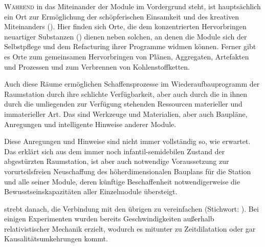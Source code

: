 \begin{newstuff}
   \lettrine{W}{ährend} in  das Miteinander der Module im Vordergrund steht, ist  hauptsächlich ein Ort zur Ermöglichung der schöpferischen Einsamkeit und des kreativen Miteinanders (). Hier finden sich Orte, die dem konzentrierten Hervorbringen neuartiger Substanzen () dienen neben solchen, an denen die Module sich der Selbstpflege und dem Refacturing ihrer Programme widmen können. Ferner gibt es Orte zum gemeinsamen Hervorbringen von Plänen, Aggregaten, Artefakten und Prozessen und zum Verbrennen von Kohlenstoffketten. 


    Auch diese Räume ermöglichen Schaffensprozesse im Wiederaufbauprogramm der Raumstation durch ihre schlichte Verfügbarkeit, aber auch durch die in ihnen durch die umliegenden  zur Verfügung stehenden Ressourcen materieller und immaterieller Art. Das sind Werkzeuge und Materialien, aber auch Baupläne, Anregungen und intelligente Hinweise anderer Module. 

    Diese Anregungen und Hinweise sind nicht immer vollständig so, wie erwartet. Das erklärt sich aus dem immer noch infantil-semidebilen Zustand der abgestürzten Raumstation, ist aber auch notwendige Voraussetzung zur vorurteilsfreien Neuschaffung des höherdimensionalen Bauplans für die Station und alle seiner Module, deren künftige Beschaffenheit notwendigerweise die Bewusstseinskapazitäten aller Einzelmodule übersteigt.

     strebt danach, die Verbindung mit den übrigen  zu vereinfachen (Stichwort: ). Bei einigen Experimenten wurden bereits Geschwindigkeiten außerhalb relativistischer Mechanik erzielt, wodurch es mitunter zu Zeitdilatation oder gar Kausalitätsumkehrungen kommt. 
    


\end{newstuff}

